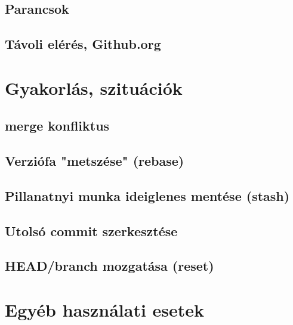 	\subsection{Parancsok}
	\subsection{Távoli elérés, Github.org}

\section{Gyakorlás, szituációk}
	\subsection{merge konfliktus}
	\subsection{Verziófa "metszése" (rebase)}
	\subsection{Pillanatnyi munka ideiglenes mentése (stash)}
	\subsection{Utolsó commit szerkesztése}
	\subsection{HEAD/branch mozgatása (reset)}

\section{Egyéb használati esetek}



